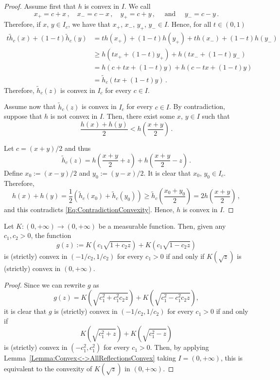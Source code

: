 \begin{proof}
Assume first that $h$ is convex in $I$. We call
$$
x_+ = c + x\,, \quad x_- = c - x\,, \quad y_+ = c + y\,, \quad \textrm{ and } \quad y_- = c - y\,.
$$
Therefore, if $x$, $y\in I_c$, we have that $x_+$, $x_-$, $y_+$, $y_- \in I$. Hence, for all $t\in
(0,1)$
\begin{align*}
t\widetilde{h}_c(x) + (1-t)\widetilde{h}_c(y)
&=  th(x_+) + (1-t)h(y_+) + t h(x_-) + (1-t)h(y_-) \\
&\geq h(tx_+ + (1-t)y_+) + h(tx_- + (1-t)y_-) \\
&= h(c + tx + (1-t)y) + h(c-tx + (1-t)y) \\
& = \widetilde{h}_c(tx + (1-t)y)\,.
\end{align*}
Therefore, $\widetilde{h}_c(z)$ is convex in $I_c$ for every $c\in I$.

Assume now that $\widetilde{h}_c(z)$ is convex in $I_c$ for every $c\in I$. By contradiction,
suppose that $h$ is not convex in $I$. Then, there exist some $x$, $y\in I$ such that
\begin{equation}
\label{Eq:ContradictionConvexity}
\dfrac{h(x) + h(y)}{2} < h \left (\dfrac{x+y}{2}\right )\,.
\end{equation}

Let $c = (x+y)/2$ and thus
$$
\widetilde{h}_c(z) = h\left( \dfrac{x+y}{2} + z\right) +  h\left( \dfrac{x+y}{2} - z\right)\,.
$$
Define $ x_0 := (x-y)/2$ and $y_0:= (y-x)/2$. It is clear that $x_0$, $y_0\in I_c$. Therefore,
$$
h(x) + h(y) = \dfrac{1}{2} \left( \widetilde{h}_c(x_0) + \widetilde{h}_c(y_0)\right )
\geq \widetilde{h}_c \left( \dfrac{x_0 + y_0}{2}\right )
= 2 h \left (\dfrac{x+y}{2}\right )\,,
$$
and this contradicts \eqref{Eq:ContradictionConvexity}. Hence, $h$ is convex in $I$.
\end{proof}


\begin{corollary}
\label{Cor:gConvex<->K(sqrt)convex} Let $K:(0,+\infty) \to (0,+\infty)$ be a measurable function.
Then, given any $c_1,c_2>0$, the function
$$
g(z) := K \left (c_1 \sqrt{1 + c_2 z}\right) +  K \left (c_1 \sqrt{1 - c_2 z}\right)
$$
is  (strictly) convex in $(-1/c_2, 1/c_2)$ for every $c_1>0$ if and only if $K(\sqrt{z})$ is
(strictly) convex in $(0, +\infty)$.
\end{corollary}
\begin{proof}
Since we can rewrite $g$ as
$$
g(z) = K \left (\sqrt{c_1^2 + c_1^2c_2 z}\right) +  K \left (\sqrt{c_1^2 - c_1^2c_2 z}\right),
$$
it is clear that $g$ is  (strictly) convex in $(-1/c_2, 1/c_2)$ for every $c_1>0$ if and only if
$$
K \left(\sqrt{c_1^2 + z}\right) +  K \left(\sqrt{c_1^2 - z}\right)
$$
is (strictly) convex in $(-c_1^2, c_1^2)$ for every $c_1>0$. Then, by applying
Lemma~\ref{Lemma:Convex<->AllReflectionsConvex} taking $I = (0,+\infty)$, this is equivalent to the
convexity of $K(\sqrt{z})$ in $(0, +\infty)$.
\end{proof}

